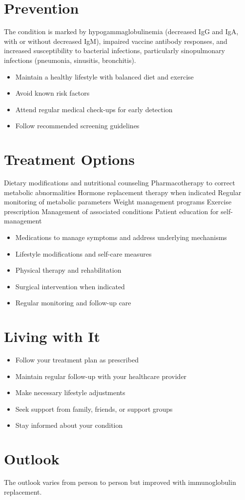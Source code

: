 \section{Prevention}
The condition is marked by hypogammaglobulinemia (decreased IgG and IgA, with or without decreased IgM), impaired vaccine antibody responses, and increased susceptibility to bacterial infections, particularly sinopulmonary infections (pneumonia, sinusitis, bronchitis).

\begin{itemize}[noitemsep]
  \item Maintain a healthy lifestyle with balanced diet and exercise
  \item Avoid known risk factors
  \item Attend regular medical check-ups for early detection
  \item Follow recommended screening guidelines
\end{itemize}
\section{Treatment Options}
Dietary modifications and nutritional counseling Pharmacotherapy to correct metabolic abnormalities Hormone replacement therapy when indicated Regular monitoring of metabolic parameters Weight management programs Exercise prescription Management of associated conditions Patient education for self-management

\begin{itemize}[noitemsep]
  \item Medications to manage symptoms and address underlying mechanisms
  \item Lifestyle modifications and self-care measures
  \item Physical therapy and rehabilitation
  \item Surgical intervention when indicated
  \item Regular monitoring and follow-up care
\end{itemize}
\section{Living with It}
\begin{itemize}[noitemsep]
  \item Follow your treatment plan as prescribed
  \item Maintain regular follow-up with your healthcare provider
  \item Make necessary lifestyle adjustments
  \item Seek support from family, friends, or support groups
  \item Stay informed about your condition
\end{itemize}
\section{Outlook}
The outlook varies from person to person but improved with immunoglobulin replacement.
